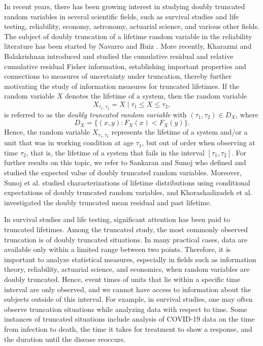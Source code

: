 \documentclass[11pt]{article}
\begin{document}
In recent years, there has been growing interest in studying doubly truncated random variables in several scientific fields, such as survival studies and life testing, reliability, economy, astronomy, actuarial science, and various other fields. The subject of doubly truncation of a lifetime random variable in the reliability literature has been started by Navarro and Ruiz \cite{Navarro1996}. More recently, Kharazmi and Balakrishnan \cite{Kharazmi2021} introduced and studied the cumulative residual and relative cumulative residual Fisher information, establishing important properties and connections to measures of uncertainty under truncation, thereby further motivating the study of information measures for truncated lifetimes. If the random variable $X$ denotes the lifetime of a system, then the random variable 
$$ \textstyle X_{\tau_1,\tau_2} = X \mid \tau_1 \leq X \leq \tau_2, $$
is referred to as the \textit{doubly truncated random variable} with $(\tau_1,\tau_2)\in D_X$, where
$$ \textstyle D_X = \{(x,y) : F_X(x) < F_X(y)\}. $$
Hence, the random variable $X_{\tau_1,\tau_2}$ represents the lifetime of a system and/or a unit that was in working condition at age $\tau_1$, but out of order when observing at time $\tau_2$, that is, the lifetime of a system that fails in the interval $[\tau_1, \tau_2]$. For further results on this topic, we refer to Sankaran and Sunoj \cite{Sankaran2004} who defined and studied the expected value of doubly truncated random variables. Moreover, Sunoj et al. \cite{Sunoj2009} studied characterizations of lifetime distributions using conditional expectations of doubly truncated random variables, and Khorashadizadeh et al. \cite{Khorashadizadeh2012} investigated the doubly truncated mean residual and past lifetime.

In survival studies and life testing, significant attention has been paid to truncated lifetimes. Among the truncated study, the most commonly observed truncation is of doubly truncated situations. In many practical cases, data are available only within a limited range between two points. Therefore, it is important to analyze statistical measures, especially in fields such as information theory, reliability, actuarial science, and economics, when random variables are doubly truncated.
Hence, event times of units that lie within a specific time interval are only observed, and we cannot have access to information about the subjects outside of this interval. For example, in survival studies, one may often observe truncation situations while analyzing data with respect to time. Some instances of truncated situations include analysis of COVID-19 data on the time from infection to death, the time it takes for treatment to show a response, and the duration until the disease reoccurs.
\end{document}
